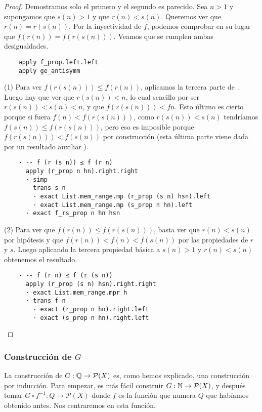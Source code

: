 \begin{proof}
  Demostramos solo el primero y el segundo es parecido. Sea $n > 1$ y supongamos que $s(n) > 1$ y que $r(n) < s(n)$. Queremos ver que $r(n) = r(s(n))$. Por la inyectividad de $f$, podemos comprobar en su lugar que $ f (r (n)) = f (r (s (n)))$. Veamos que se cumplen ambas desigualdades.

  \begin{lstlisting}
    apply f_prop.left.left
    apply ge_antisymm \end{lstlisting}

  (1) Para ver $f (r (s (n))) \leq f (r (n))$, aplicamos la tercera parte de . Luego hay que ver que $r(s(n)) < n$, lo cual sencillo por ser $r(s(n)) < s(n) < n$, y que $f (r (s (n))) < f n$. Esto último es cierto porque si fuera $f(n) < f(r(s(n)))$, como $r(s(n)) < s(n)$ tendríamos $f(s (n)) \leq f(r(s(n)))$, pero eso es imposible porque $f(r(s(n))) < f(s(n))$ por construcción (esta última parte viene dada por un resultado auxiliar ).

  \begin{lstlisting}
    · -- f (r (s n)) ≤ f (r n)
      apply (r_prop n hn).right.right
      · simp
        trans s n
        · exact List.mem_range.mp (r_prop (s n) hsn).left
        · exact List.mem_range.mp (s_prop n hn).left
      · exact f_rs_prop n hn hsn
  \end{lstlisting}

  (2) Para ver que $f (r (n)) \leq f (r (s (n)))$, basta ver que $r(n) < s(n)$ por hipótesis y que $f(r(n)) < f(n) < f(s(n))$ por las propiedades de $r$ y $s$. Luego aplicando la tercera propiedad básica a $s(n) > 1$ y $r(n) < s(n)$ obtenemos el resultado.

  \begin{lstlisting}
    · -- f (r n) ≤ f (r (s n))
      apply (r_prop (s n) hsn).right.right
      · exact List.mem_range.mpr h
      · trans f n
        · exact (r_prop n hn).right.left
        · exact (s_prop n hn).right.left \end{lstlisting}
\end{proof}

\subsubsection{Construcción de $G$} 

La construcción de $G : \mathbb{Q} \to \mathcal{P}(X)$ es, como hemos explicado, una construcción por inducción. Para empezar, es más fácil construir $G : \mathbb{N} \to \mathcal{P}(X)$, y después tomar $G \circ f^{-1} : Q \to \mathcal{P}(X)$ donde $f$ es la función que numera $Q$ que habíamos obtenido antes. Nos centraremos en esta función.


